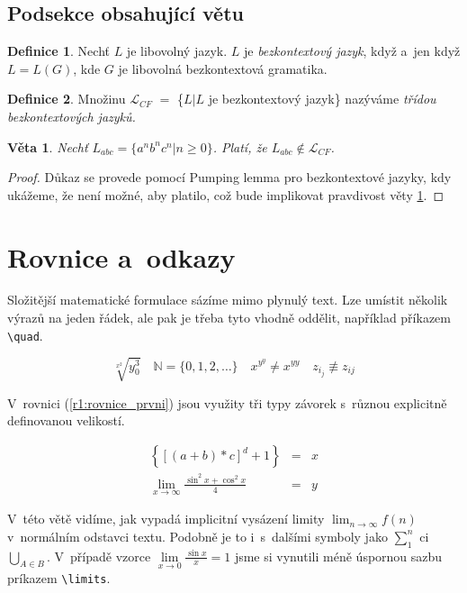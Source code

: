 \documentclass[11pt, titlepage, a4paper, twocolumn]{article}
\theoremstyle{definition}
\newtheorem{definition}{Definice}[section]
\theoremstyle{plain}
\newtheorem{sentence}{Věta}
\begin{document}
    \subsection{Podsekce obsahující větu}
        \begin{definition}
            Nechť $L$ je libovolný jazyk. $L$ je \emph{bezkontextový jazyk}, když a~jen když $L=L(G)$,
            kde $G$ je libovolná bezkontextová gramatika.
        \end{definition}
        \begin{definition}
            Množinu $\mathcal{L}_{CF}$ $=$ \{$L|L$ je bezkontextový jazyk\} nazýváme
            \emph{třídou bezkontextových jazyků.}
        \end{definition}
        \begin{sentence} \label{v1:veta}
            Nechť $L_{abc}=\{a^nb^nc^n|n \geq 0\}$. Platí, že $L_{abc} \notin \mathcal{L}_{CF}$.
        \end{sentence}
				\begin{proof}
        		Důkaz se provede pomocí Pumping lemma pro bezkontextové jazyky, kdy ukážeme,
        		že není možné, aby platilo, což bude implikovat pravdivost věty \ref{v1:veta}.
    		\end{proof}
		\par

    \section{Rovnice a~odkazy}
        Složitější matematické formulace sázíme mimo plynulý text. Lze umístit několik výrazů na jeden řádek, ale
        pak je třeba tyto vhodně oddělit, například příkazem \verb|\quad|.

        $$\sqrt[x^2]{y_0^3}\quad \mathbb{N}=\{0,1,2,\ldots\}\quad x^{y^y} \neq x^{yy}\quad
        z_{i_j}\not\equiv z_{ij}$$

        V~rovnici (\ref{r1:rovnice_prvni}) jsou využity tři typy závorek s~různou explicitně definovanou velikostí.

        \begin{eqnarray} \label{r1:rovnice_prvni}
        \left\{\left[\left(a + b\right) * c\right]^d + 1\right\}&=&x\\
        \lim_{x \rightarrow \infty} \frac{\sin^2x + \cos^2x}{4}&=&y \nonumber
        \end{eqnarray}

        V~této větě vidíme, jak vypadá implicitní vysázení limity $\lim_{n \rightarrow \infty} f(n)$  v~normálním
        odstavci textu. Podobně je to i~s~dalšími symboly jako $\sum_1^n$ ci $\bigcup_{A \in B}$. V~případě vzorce
        $\lim\limits_{x \rightarrow 0} \frac{\sin x}{x} = 1$ jsme si vynutili méně úspornou sazbu príkazem
        \verb|\limits|.
\end{document}
